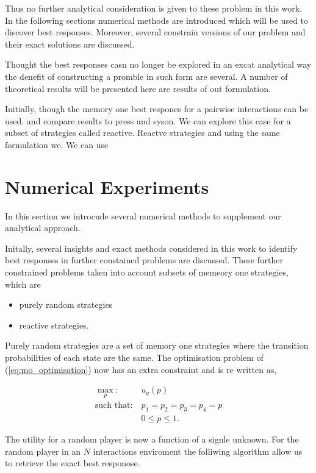 \documentclass[10pt]{article}
\begin{document}
Thus no further analytical consideration is given to these problem in this work.
In the following sections numerical methods are introduced which will be used to
discover best responses. Moreover, several constrain versions of our problem
and their exact solutions are discussed.

Thought the best responses casn no longer be explored in an excat analytical way
the denefit of constructing a promble in such form are several. A number of theoretical
results will be presented here are results of out formulation.

Initially, though the memory one best respones for a pairwise interactions can
be used. and compare results to press and syson. We can explore this case 
for a subset of strategies called reactive. Reactve strategies and using the same
formulation we. We can use 

\section{Numerical Experiments}

In this section we introcude several numerical methods to supplement our analytical
approach.

Initally, several insights and exact methods considered in this work to identify
best responses in further constained problems are discussed. These further
constrained problems taken into account subsets of memeory one strategies, which
are

\begin{itemize}
    \item purely random strategies
    \item reactive strategies.
\end{itemize}

Purely random strategies are a set of memory one strategies where the transition
probabilities of each state are the same. The optimisation problem of (\ref{eq:mo_optimisation})
now has an extra constraint and is re written as,

\begin{equation}\label{eq:random_optimisation}
\begin{aligned}
\max_p: & \ u_q(p)
\\
\text{such that}: & \ p_1 = p_2 = p_3 = p_4 = p\\
    & \ 0 \leq p \leq 1. 
\end{aligned}
\end{equation}

The utility for a random player is now a function of a signle unknown. For the
random player in an \(N\) interactions enviroment the folliwing algorithm allow us to
retrieve the exact best responose.
\end{document}
